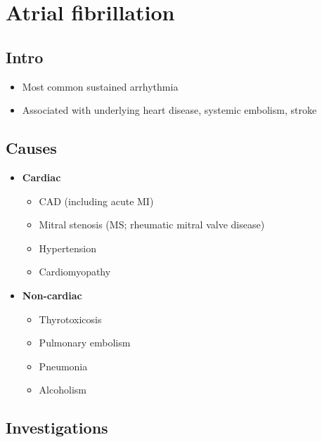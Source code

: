 \documentclass[
  12pt,
]{memoir}
\providecommand{\tightlist}{%
  \setlength{\itemsep}{0pt}\setlength{\parskip}{0pt}}
\begin{document}
\hypertarget{atrial-fibrillation}{%
\section{Atrial fibrillation}\label{atrial-fibrillation}}

\hypertarget{intro-1}{%
\subsection{Intro}\label{intro-1}}

\begin{itemize}
\tightlist
\item
  Most common sustained arrhythmia
\item
  Associated with underlying heart disease, systemic embolism, stroke
\end{itemize}

\hypertarget{causes}{%
\subsection{Causes}\label{causes}}

\begin{itemize}
\tightlist
\item
  \textbf{Cardiac}

  \begin{itemize}
  \tightlist
  \item
    CAD (including acute MI)
  \item
    Mitral stenosis (MS; rheumatic mitral valve disease)
  \item
    Hypertension
  \item
    Cardiomyopathy
  \end{itemize}
\item
  \textbf{Non-cardiac}

  \begin{itemize}
  \tightlist
  \item
    Thyrotoxicosis
  \item
    Pulmonary embolism
  \item
    Pneumonia
  \item
    Alcoholism
  \end{itemize}
\end{itemize}

\hypertarget{investigations}{%
\subsection{Investigations}\label{investigations}}
\end{document}
